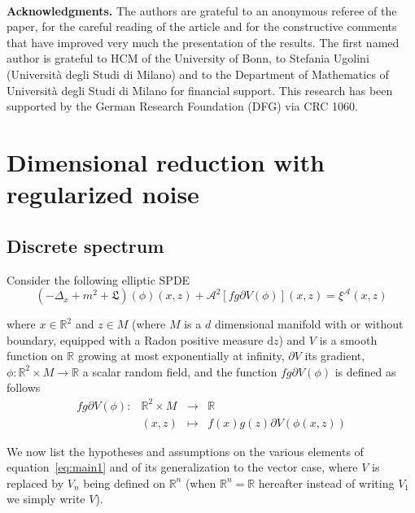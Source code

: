 \documentclass[a4paper,10pt]{article}
\newcommand{\mathd}{\mathrm{d}}
\newcommand{\tmtextbf}[1]{{\bfseries{#1}}}
\begin{document}
\

\tmtextbf{Acknowledgments.} The authors are grateful to an anonymous referee
of the paper, for the careful reading of the article and for the constructive
comments that have improved very much the presentation of the results. The
first named author is grateful to HCM of the University of Bonn, to Stefania
Ugolini (Universit{\`a} degli Studi di Milano) and to the Department of
Mathematics of Universit{\`a} degli Studi di Milano for financial support.
This research has been supported by the German Research Foundation (DFG) via
CRC 1060.

\section{Dimensional reduction with regularized noise}\label{section_discrete}

\subsection{Discrete spectrum}\label{section_discrete1}

Consider the following elliptic SPDE
\begin{equation}\label{eq:main1}
  (- \Delta_x + m^2 + \mathfrak{L}) (\phi) (x, z) + \mathcal{A}^2 [f g
 \partial V (\phi)] (x, z) = \xi^{\mathcal{A}} (x, z) 
\end{equation}

where $x \in \mathbb{R}^2$ and $z \in M$ (where $M$ is a $d$ dimensional
manifold with or without boundary, equipped with a Radon positive measure
$\mathd z$) and $V$ is a smooth function on $\mathbb{R}$ growing at most
exponentially at infinity, $\partial V$ its gradient, $\phi : \mathbb{R}^2
\times M \rightarrow \mathbb{R}$ a scalar random field, and the function $f g
 \partial V (\phi)$ is defined as follows
\begin{equation}
\begin{array}{cccl}
f g \partial V(\phi):& \mathbb{R}^2\times M & \longrightarrow & \mathbb{R}\\
& (x, z) &\longmapsto &f (x) g (z) \partial V
(\phi (x, z)) 
\end{array}\label{eq:def}\end{equation}


We now list the hypotheses and assumptions on the various elements of
equation~{\eqref{eq:main1}} and of its generalization to the vector case,
where $V$ is replaced by $V_n$ being defined on $\mathbb{R}^n$ (when
$\mathbb{R}^n =\mathbb{R}$ hereafter instead of writing $V_1$ we simply write
$V$).
\end{document}
